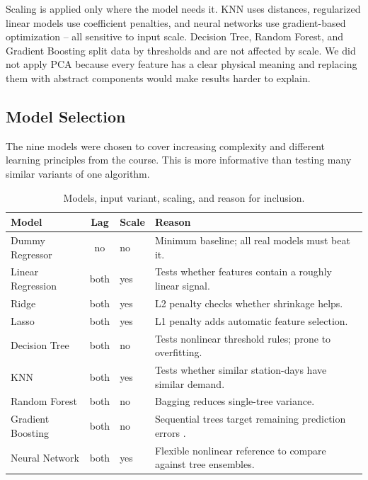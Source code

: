 Scaling is applied only where the model needs it. KNN uses distances, 
regularized linear models use coefficient penalties, and neural networks 
use gradient-based optimization -- all sensitive to input scale. 
Decision Tree, Random Forest, and Gradient Boosting split data by 
thresholds and are not affected by scale. We did not apply PCA because 
every feature has a clear physical meaning and replacing them with 
abstract components would make results harder to explain.

\subsection{Model Selection}

The nine models were chosen to cover increasing complexity and different 
learning principles from the course. This is more informative than 
testing many similar variants of one algorithm.

\begin{table}[htbp]
\caption{Models, input variant, scaling, and reason for inclusion.}
\label{tab:models}
\centering
\scriptsize
\begin{tabularx}{\columnwidth}{p{} c p{} X}
\toprule
\textbf{Model} & \textbf{Lag} & \textbf{Scale} & \textbf{Reason} \\
\midrule
Dummy Regressor & no & no & 
Minimum baseline; all real models must beat it. \\
\addlinespace
Linear Regression & both & yes & 
Tests whether features contain a roughly linear signal. \\
\addlinespace
Ridge & both & yes & 
L2 penalty checks whether shrinkage helps. \\
\addlinespace
Lasso & both & yes & 
L1 penalty adds automatic feature selection. \\
\addlinespace
Decision Tree & both & no & 
Tests nonlinear threshold rules; prone to overfitting. \\
\addlinespace
KNN & both & yes & 
Tests whether similar station-days have similar demand. \\
\addlinespace
Random Forest & both & no & 
Bagging reduces single-tree variance. \\
\addlinespace
Gradient Boosting & both & no & 
Sequential trees target remaining prediction errors \cite{friedman2001}. \\
\addlinespace
Neural Network & both & yes & 
Flexible nonlinear reference to compare against tree ensembles. \\
\bottomrule
\end{tabularx}
\end{table}
